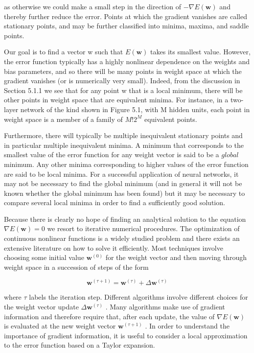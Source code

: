 \documentclass[
  10
]{article}
\begin{document}
as otherwise we could make a small step in the direction of
\(- \nabla E ( \mathbf { w } )\) and thereby further reduce the error.
Points at which the gradient vanishes are called stationary points, and
may be further classified into minima, maxima, and saddle points.

Our goal is to find a vector w such that \(E ( \mathbf { w } )\) takes
its smallest value. However, the error function typically has a highly
nonlinear dependence on the weights and bias parameters, and so there
will be many points in weight space at which the gradient vanishes (or
is numerically very small). Indeed, from the discussion in Section 5.1.1
we see that for any point w that is a local minimum, there will be other
points in weight space that are equivalent minima. For instance, in a
two-layer network of the kind shown in Figure 5.1, with M hidden units,
each point in weight space is a member of a family of \(M ! 2 ^ { M }\)
equivalent points.

Furthermore, there will typically be multiple inequivalent stationary
points and in particular multiple inequivalent minima. A minimum that
corresponds to the smallest value of the error function for any weight
vector is said to be a \(g l o b a l\) minimum. Any other minima
corresponding to higher values of the error function are said to be
local minima. For a successful application of neural networks, it may
not be necessary to find the global minimum (and in general it will not
be known whether the global minimum has been found) but it may be
necessary to compare several local minima in order to find a
sufficiently good solution.

Because there is clearly no hope of finding an analytical solution to
the equation \(\nabla E ( \mathbf { w } ) = 0\) we resort to iterative
numerical procedures. The optimization of continuous nonlinear functions
is a widely studied problem and there exists an extensive literature on
how to solve it efficiently. Most techniques involve choosing some
initial value \(\mathbf { w } ^ { ( 0 ) }\) for the weight vector and
then moving through weight space in a succession of steps of the form

\[
\mathbf {w} ^ {(\tau + 1)} = \mathbf {w} ^ {(\tau)} + \Delta \mathbf {w} ^ {(\tau)}\tag{5.27}
\]

where \(\tau\) labels the iteration step. Different algorithms involve
different choices for the weight vector update
\(\Delta \mathbf { w } ^ { ( \tau ) }\) . Many algorithms make use of
gradient information and therefore require that, after each update, the
value of \(\nabla E ( \mathbf { w } )\) is evaluated at the new weight
vector \(\mathbf { w } ^ { ( \tau + 1 ) }\) . In order to understand the
importance of gradient information, it is useful to consider a local
approximation to the error function based on a Taylor expansion.
\end{document}
